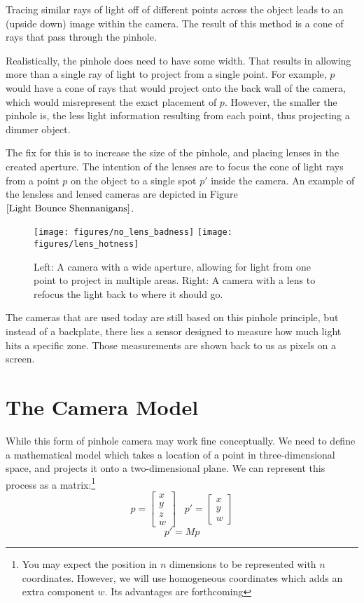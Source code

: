 \documentclass[
    12pt,
    twoside,
    bibstyle=chicago,
    headerstyle=uppercase,
	bibfile=thesis_updating.bib
]{reedthesis}
\begin{document}
Tracing similar rays of light off of different points across the object leads to an (upside down) image within the camera. The result of this method is a cone of rays that pass through the pinhole.

Realistically, the pinhole does need to have some width. That results in allowing more than a single ray of light to project from a single point. For example, $p$ would have a cone of rays that would project onto the back wall of the camera, which would misrepresent the exact placement of $p$. However, the smaller the pinhole is, the less light information resulting from each point, thus projecting a dimmer object.

The fix for this is to increase the size of the pinhole, and placing lenses in the created aperture. The intention of the lenses are to focus the cone of light rays from a point $p$ on the object to a single spot $p'$ inside the camera. An example of the lensless and lensed cameras are depicted in Figure $\ref{Light Bounce Shennanigans}$. 



\begin{figure}[t]
	    \centering
	    \texttt{[image: figures/no\_lens\_badness]}
		\hfill
		\texttt{[image: figures/lens\_hotness]}
	    \caption{Left: A camera with a wide aperture, allowing for light from one point to project in multiple areas. Right: A camera with a lens to refocus the light back to where it should go.}
	\label{Light Bounce Shenanigans}
	\end{figure}


The cameras that are used today are still based on this pinhole principle, but instead of a backplate, there lies a sensor designed to measure how much light hits a specific zone. Those measurements are shown back to us as pixels on a screen.


\section{The Camera Model}

While this form of pinhole camera may work fine conceptually. We need to define a mathematical model which takes a location of a point in three-dimensional space, and projects it onto a two-dimensional plane. We can represent this process as a matrix:\footnote{You may expect the position in $n$ dimensions to be represented with $n$ coordinates. However, we will use homogeneous coordinates which adds an extra component $w$. Its advantages are forthcoming}
\[p = \left[\begin{smallmatrix}
	x\\y\\z\\w
\end{smallmatrix}\right] \;\;\; p' = \left[\begin{smallmatrix}
	x\\y\\w
\end{smallmatrix}\right]\]
\[p' = Mp\]
\end{document}
